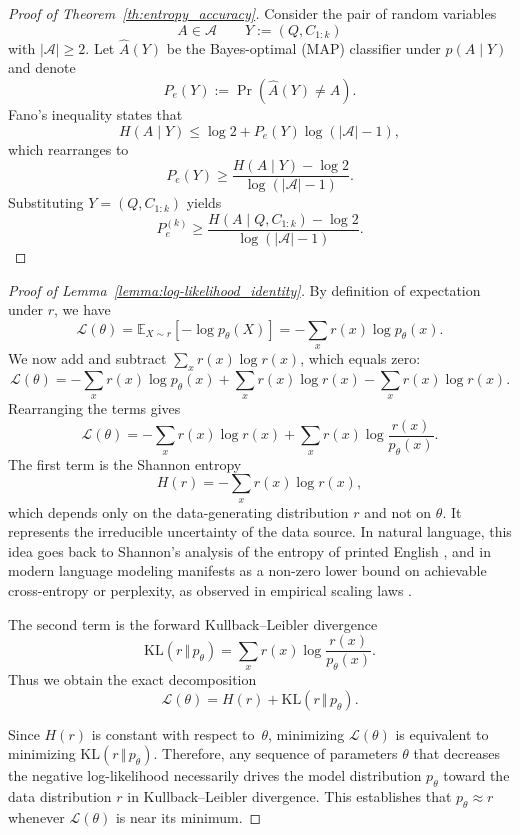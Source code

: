 \documentclass{article}
\begin{document}
\begin{proof}[Proof of Theorem~\ref{th:entropy_accuracy}]
Consider the pair of random variables
\[
A \in \mathcal{A} \qquad Y := (Q, C_{1:k})
\]
with $|\mathcal A|\ge 2$. Let $\hat A(Y)$ be the Bayes-optimal (MAP) classifier under $p(A\mid Y)$ and denote
\[
P_e(Y) := \Pr(\hat A(Y)\neq A).
\]
Fano's inequality \cite{Cover2006} states that 
\[
H(A\mid Y) \le \log 2 + P_e(Y)\log(|\mathcal A|-1),
\]
which rearranges to
\[
P_e(Y) \ge \frac{H(A\mid Y)-\log 2}{\log(|\mathcal A|-1)}.
\]
Substituting $Y=(Q,C_{1:k})$ yields
\[
P_e^{(k)} \ge \frac{H(A\mid Q,C_{1:k})-\log 2}{\log(|\mathcal A|-1)}.
\]
\end{proof}



\begin{proof}[Proof of Lemma~\ref{lemma:log-likelihood_identity}]
By definition of expectation under $r$, we have
\[
\mathcal{L}(\theta)
= \mathbb{E}_{X\sim r}[-\log p_\theta(X)]
= -\sum_{x} r(x)\log p_\theta(x).
\]
We now add and subtract $\sum_{x} r(x)\log r(x)$, which equals zero:
\[
\mathcal{L}(\theta)
= -\sum_{x} r(x)\log p_\theta(x)
  + \sum_{x} r(x)\log r(x)
  - \sum_{x} r(x)\log r(x).
\]
Rearranging the terms gives
\[
\mathcal{L}(\theta)
= -\sum_{x} r(x)\log r(x)
  + \sum_{x} r(x)\log\frac{r(x)}{p_\theta(x)}.
\]
The first term is the Shannon entropy
\[
H(r) = -\sum_{x} r(x)\log r(x),
\]
which depends only on the data-generating distribution $r$ and not on $\theta$. It represents the irreducible uncertainty of the data source. In natural language, this idea goes back to Shannon’s analysis of the entropy of printed English \citep{6773263}, and in modern language modeling manifests as a non-zero lower bound on achievable cross-entropy or perplexity, as observed in empirical scaling laws \citep{kaplan2020scalinglawsneurallanguage}. 

The second term is the forward Kullback--Leibler divergence
\[
\mathrm{KL}(r \,\Vert\, p_\theta)
= \sum_{x} r(x)\log \frac{r(x)}{p_\theta(x)}.
\]
Thus we obtain the exact decomposition
\[
\mathcal{L}(\theta)
= H(r) + \mathrm{KL}(r \,\Vert\, p_\theta).
\]

Since $H(r)$ is constant with respect to~$\theta$, minimizing $\mathcal{L}(\theta)$ is equivalent to minimizing $\mathrm{KL}(r \,\Vert\, p_\theta)$.   Therefore, any sequence of parameters $\theta$ that decreases the negative log-likelihood necessarily drives the model distribution $p_\theta$ toward the data distribution $r$ in Kullback--Leibler divergence.  This establishes that $p_\theta \approx r$ whenever $\mathcal{L}(\theta)$ is near its minimum.
\end{proof}
\end{document}
